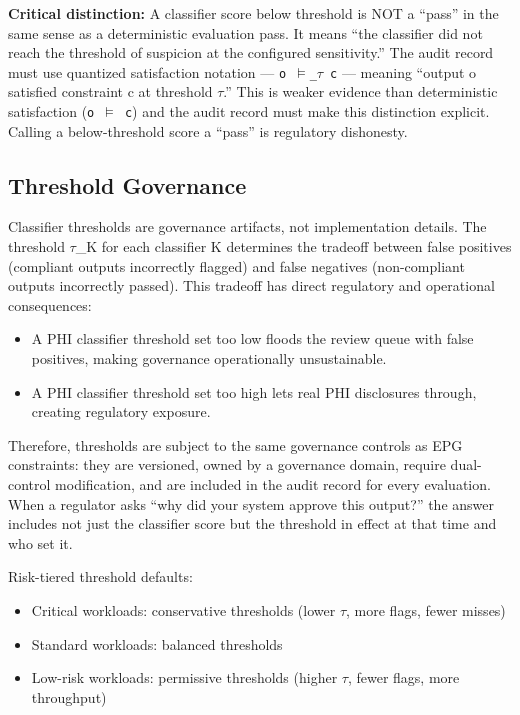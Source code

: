 \textbf{Critical distinction:} A classifier score below threshold is NOT a ``pass'' in the same sense as a deterministic evaluation pass. It means ``the classifier did not reach the threshold of suspicion at the configured sensitivity.'' The audit record must use quantized satisfaction notation --- \texttt{o $\vDash$\_\allowbreak{}$\tau$ c} --- meaning ``output o satisfied constraint c at threshold $\tau$.'' This is weaker evidence than deterministic satisfaction (\texttt{o $\vDash$ c}) and the audit record must make this distinction explicit. Calling a below-threshold score a ``pass'' is regulatory dishonesty.

\subsection{Threshold Governance}


Classifier thresholds are governance artifacts, not implementation details. The threshold $\tau$\_\allowbreak{}K for each classifier K determines the tradeoff between false positives (compliant outputs incorrectly flagged) and false negatives (non-compliant outputs incorrectly passed). This tradeoff has direct regulatory and operational consequences:

\begin{itemize}
  \item A PHI classifier threshold set too low floods the review queue with false positives, making governance operationally unsustainable.
  \item A PHI classifier threshold set too high lets real PHI disclosures through, creating regulatory exposure.
\end{itemize}


Therefore, thresholds are subject to the same governance controls as EPG constraints: they are versioned, owned by a governance domain, require dual-control modification, and are included in the audit record for every evaluation. When a regulator asks ``why did your system approve this output?'' the answer includes not just the classifier score but the threshold in effect at that time and who set it.

Risk-tiered threshold defaults:
\begin{itemize}
  \item Critical workloads: conservative thresholds (lower $\tau$, more flags, fewer misses)
  \item Standard workloads: balanced thresholds
  \item Low-risk workloads: permissive thresholds (higher $\tau$, fewer flags, more throughput)
\end{itemize}


